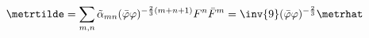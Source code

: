 \begin{equation}
  \label{eq:tildemetric}
  \metrtilde = \sum_{m,n} \tilde{\alpha}_{mn} (\bar{\varphi}
  \varphi)^{-\frac{2}{3}(m+n+1)} F^n \bar{F}^m = \inv{9} (\bar{\varphi}
  \varphi)^{-\frac{2}{3}} \metrhat
\end{equation}

